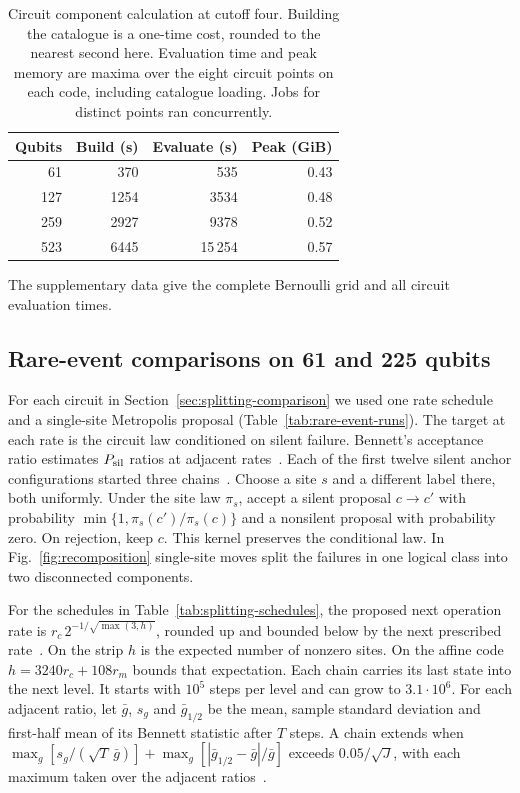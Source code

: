 \documentclass[10pt,twocolumn]{article}
\theoremstyle{definition}
\begin{document}
\begin{table}[H]
\centering\small
\setlength{\tabcolsep}{3.5pt}
\caption{Circuit component calculation at cutoff four. Building the
catalogue is a one-time cost, rounded to the nearest second here.
Evaluation time and peak memory are maxima over the eight circuit
points on each code, including catalogue loading. Jobs for distinct
points ran concurrently.}
\label{tab:strip-resources}
\smallskip
\begin{tabular}{@{}rrrr@{}}
\toprule
Qubits & Build (s) & Evaluate (s) & Peak (GiB)\\
\midrule
61  & 370  & 535    & 0.43\\
127 & 1254 & 3534   & 0.48\\
259 & 2927 & 9378   & 0.52\\
523 & 6445 & 15\,254 & 0.57\\
\bottomrule
\end{tabular}
\end{table}

The supplementary data give the complete Bernoulli grid and all circuit evaluation times.

\subsection{Rare-event comparisons on 61 and 225 qubits}\label{app:rare-methods}
For each circuit in Section~\ref{sec:splitting-comparison} we used
one rate schedule and a single-site Metropolis proposal
(Table~\ref{tab:rare-event-runs}). The target at each rate is the
circuit law conditioned on silent failure. Bennett's acceptance
ratio estimates $P_{\rm sil}$ ratios at adjacent rates~\cite{Bennett76,BV13}.
Each of the first twelve silent anchor configurations started three
chains~\cite{BCCY25}. Choose a site $s$ and a different label there,
both uniformly. Under the site law $\pi_s$, accept a silent proposal
$c\to c'$ with probability $\min\{1,\pi_s(c')/\pi_s(c)\}$ and a
nonsilent proposal with probability zero. On rejection, keep $c$.
This kernel preserves the conditional law. In Fig.~\ref{fig:recomposition}
single-site moves split the failures in one logical class into two
disconnected components.

For the schedules in Table~\ref{tab:splitting-schedules}, the proposed
next operation rate is $r_c\,2^{-1/\sqrt{\max(3,h)}}$, rounded up
and bounded below by the next prescribed rate~\cite{BV13}. On the
strip $h$ is the expected number of nonzero sites. On the affine code
$h=3240r_c+108r_m$ bounds that expectation. Each chain carries its
last state into the next level. It starts with $10^5$ steps per level
and can grow to $3.1\cdot10^6$. For each adjacent ratio, let $\bar g$,
$s_g$ and $\bar g_{1/2}$ be the mean, sample standard deviation and
first-half mean of its Bennett statistic after $T$ steps. A chain
extends when $\max_g[s_g/(\sqrt{T}\,\bar g)]+
\max_g[|\bar g_{1/2}-\bar g|/\bar g]$ exceeds $0.05/\sqrt{J}$,
with each maximum taken over the adjacent ratios~\cite{BCCY25}.
\end{document}
